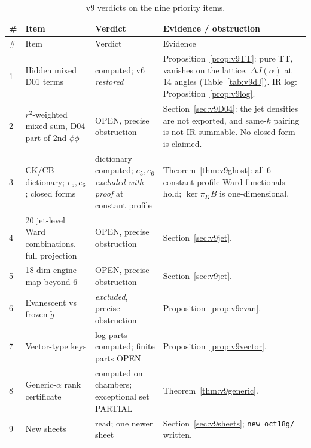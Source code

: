 \documentclass[11pt,a4paper]{article}
\newcommand{\loc}[1]{\nolinkurl{#1}}
\newcommand{\OPEN}{\textsf{OPEN}}
\newcommand{\PARTIAL}{\textsf{PARTIAL}}
\theoremstyle{plain}
\theoremstyle{definition}
\theoremstyle{remark}
\numberwithin{equation}{section}
\begin{document}
\begingroup\small
\begin{longtable}{@{}L{.05\linewidth}L{.27\linewidth}L{.20\linewidth}L{.40\linewidth}@{}}
\caption{v9 verdicts on the nine priority items.}\label{tab:v9verdict}\\
\toprule
\# & Item & Verdict & Evidence / obstruction\\
\midrule
\endfirsthead
\toprule
\# & Item & Verdict & Evidence\\
\midrule
{} & Hidden mixed D01 terms & computed; v6 \emph{restored} &
Proposition~\ref{prop:v9TT}: pure TT, vanishes on the lattice.
\(\Delta J(\alpha)\) at 14 angles (Table~\ref{tab:v9dJ}).
IR log: Proposition~\ref{prop:v9log}.\\
2 & \(r^2\)-weighted mixed sum, D04 part of 2nd \(\phi\phi\) &
\OPEN, precise obstruction & Section~\ref{sec:v9D04}: the jet densities
are not exported, and same-\(k\) pairing is not IR-summable. No
closed form is claimed.\\
3 & CK/CB dictionary; \(e_5,e_6\); closed forms &
dictionary computed; \(e_5,e_6\) \emph{excluded with proof} at constant profile &
Theorem~\ref{thm:v9ghost}: all 6 constant-profile Ward functionals
hold; \(\ker\pi_KB\) is one-dimensional.\\
4 & 20 jet-level Ward combinations, full projection &
\OPEN, precise obstruction & Section~\ref{sec:v9jet}.\\
5 & 18-dim engine map beyond 6 & \OPEN, precise obstruction &
Section~\ref{sec:v9jet}.\\
6 & Evanescent vs frozen \(\tilde g\) & \emph{excluded}, precise obstruction &
Proposition~\ref{prop:v9evan}.\\
7 & Vector-type keys & log parts computed; finite parts \OPEN &
Proposition~\ref{prop:v9vector}.\\
8 & Generic-\(\alpha\) rank certificate &
computed on chambers; exceptional set \PARTIAL &
Theorem~\ref{thm:v9generic}.\\
9 & New sheets & read; one newer sheet & Section~\ref{sec:v9sheets};
\loc{new_oct18g/} written.\\
\bottomrule
\end{longtable}
\endgroup
\end{document}
